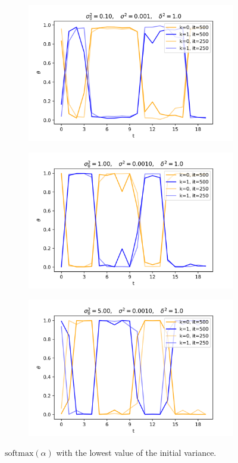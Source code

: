 \documentclass[12pt]{article}
\begin{document}
\begin{figure}[H]
  \begin{subfigure}[b]{0.33\textwidth}
    \includegraphics[width=\linewidth]{init_1E-01|basic_1E-03|prop_1E+00|it_500}
  \end{subfigure}%
  \begin{subfigure}[b]{0.33\textwidth}
    \includegraphics[width=\linewidth]{init_1E+00|basic_1E-03|prop_1E+00|it_500}
  \end{subfigure}%
  \begin{subfigure}[b]{0.33\textwidth}
    \includegraphics[width=\linewidth]{init_5E+00|basic_1E-03|prop_1E+00|it_500}
  \end{subfigure}
  \caption{$\mbox{softmax}(\alpha)$ with the lowest value of the initial variance.}\label{fig:animals}
\end{figure}
\end{document}
